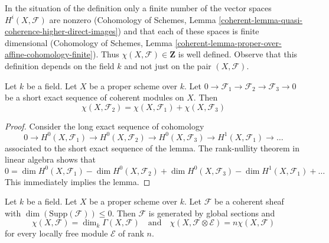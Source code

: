 \noindent
In the situation of the definition only a finite number of the vector spaces
$H^i(X, \mathcal{F})$ are nonzero (Cohomology of Schemes, Lemma
\ref{coherent-lemma-quasi-coherence-higher-direct-images})
and that each of these spaces is finite dimensional
(Cohomology of Schemes, Lemma
\ref{coherent-lemma-proper-over-affine-cohomology-finite}). Thus
$\chi(X, \mathcal{F}) \in \mathbf{Z}$ is well defined. Observe that
this definition depends on the field $k$ and not just on the pair
$(X, \mathcal{F})$.

\begin{lemma}
\label{lemma-euler-characteristic-additive}
Let $k$ be a field. Let $X$ be a proper scheme over $k$.
Let $0 \to \mathcal{F}_1 \to \mathcal{F}_2 \to \mathcal{F}_3 \to 0$
be a short exact sequence of coherent modules on $X$. Then
$$
\chi(X, \mathcal{F}_2) = \chi(X, \mathcal{F}_1) + \chi(X, \mathcal{F}_3)
$$
\end{lemma}

\begin{proof}
Consider the long exact sequence of cohomology
$$
0 \to H^0(X, \mathcal{F}_1) \to H^0(X, \mathcal{F}_2) \to
H^0(X, \mathcal{F}_3) \to H^1(X, \mathcal{F}_1) \to \ldots
$$
associated to the short exact sequence of the lemma. The rank-nullity theorem
in linear algebra shows that
$$
0 = \dim H^0(X, \mathcal{F}_1) - \dim H^0(X, \mathcal{F}_2)
+ \dim H^0(X, \mathcal{F}_3) - \dim H^1(X, \mathcal{F}_1) + \ldots
$$
This immediately implies the lemma.
\end{proof}

\begin{lemma}
\label{lemma-chi-tensor-finite}
Let $k$ be a field. Let $X$ be a proper scheme over $k$. Let $\mathcal{F}$
be a coherent sheaf with $\dim(\text{Supp}(\mathcal{F})) \leq 0$.
Then $\mathcal{F}$ is generated by global sections and
$$
\chi(X, \mathcal{F}) = \dim_k\Gamma(X, \mathcal{F})
\quad\text{and}\quad
\chi(X, \mathcal{F} \otimes \mathcal{E}) = n\chi(X, \mathcal{F})
$$
for every locally free module $\mathcal{E}$ of rank $n$.
\end{lemma}

